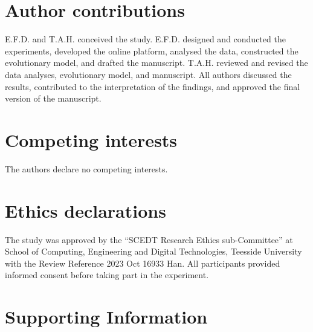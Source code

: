 \documentclass[pdflatex,sn-mathphys-ay]{sn-jnl}
\theoremstyle{thmstyleone}
\theoremstyle{thmstyletwo}
\theoremstyle{thmstylethree}
\begin{document}
\section*{Author contributions}

E.F.D. and T.A.H. conceived the study. E.F.D. designed and conducted the experiments, developed the online platform, analysed the data, constructed the evolutionary model, and drafted the manuscript. T.A.H. reviewed and revised the data analyses, evolutionary model, and manuscript. All authors discussed the results, contributed to the interpretation of the findings, and approved the final version of the manuscript.

\section*{Competing interests}

The authors declare no competing interests.

\section*{Ethics declarations}

The study was approved by the ``SCEDT Research Ethics sub-Committee'' at School of Computing, Engineering and Digital Technologies, Teesside University with the Review Reference 2023 Oct 16933 Han. All participants provided informed consent before taking part in the experiment.



\clearpage
\section*{Supporting Information}

\renewcommand{\thesection}{S\arabic{section}}
\renewcommand{\thesubsection}{S\arabic{section}.\arabic{subsection}}
\renewcommand{\thesubsubsection}{S\arabic{section}.\arabic{subsection}.\arabic{subsubsection}}
\renewcommand{\thefigure}{S\arabic{figure}}
\renewcommand{\thetable}{S\arabic{table}}

\makeatletter
\renewcommand{\theHsection}{SI.\arabic{section}}
\renewcommand{\theHsubsection}{SI.\arabic{section}.\arabic{subsection}}
\renewcommand{\theHsubsubsection}{SI.\arabic{section}.\arabic{subsection}.\arabic{subsubsection}}
\renewcommand{\theHfigure}{SI.\arabic{figure}}
\renewcommand{\theHtable}{SI.\arabic{table}}
\makeatother
\end{document}
